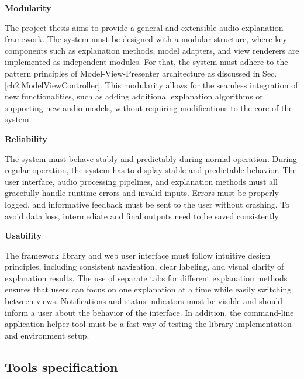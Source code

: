 \documentclass[
    bindingoffset=5mm,  %
    footnoteindent=3mm, %
    hyphenation=true    %
]{src/wut-thesis}
\begin{document}
\begin{description}
    \item \textbf{Modularity}

         The project thesis aims to provide a general and extensible audio explanation framework.
    The system must be  designed with a modular structure, where key components such as explanation methods,
    model adapters, and view renderers are implemented as independent modules. For that, the system must 
    adhere to the pattern principles of Model-View-Presenter architecture as discussed in Sec.
    \ref{ch2:ModelViewController}. This modularity allows for the seamless integration of new 
    functionalities, such as adding additional explanation algorithms or supporting new audio models,
    without requiring  modifications to the core of the system.

    \item \textbf{Reliability}

        The system must behave stably and predictably during normal operation. During regular operation,
    the system has to display stable and predictable behavior. The user interface, audio processing pipelines,
    and explanation methods must all gracefully handle runtime errors and invalid inputs. Errors must be
    properly logged, and informative feedback must be sent to the user without crashing.
    To avoid data loss, intermediate and final outputs need to be saved consistently.

    \item \textbf{Usability}

        The framework library and web user interface must follow intuitive design principles,
    including consistent navigation, clear labeling, and visual clarity of explanation results.
    The use of separate tabs for different explanation methods ensures that users can focus on one
    explanation at a time while easily switching between views. Notifications and status indicators
    must be visible and should inform a user about the behavior of the interface. In addition,
    the command-line application helper tool must be a fast way of testing the library
    implementation and environment setup.

\end{description}

\subsection{Tools specification} \label{ch:ToolsSpecification}
\end{document}
